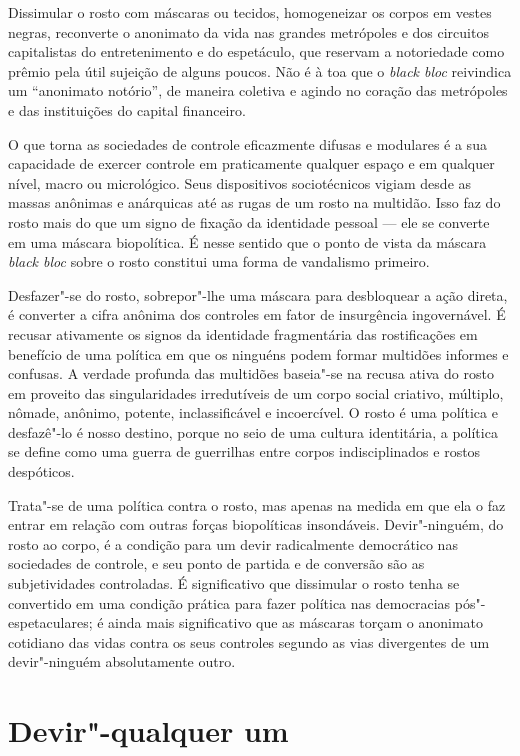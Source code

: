 Dissimular o rosto com máscaras ou tecidos, homogeneizar os corpos em
vestes negras, reconverte o anonimato da vida nas grandes metrópoles e
dos circuitos capitalistas do entretenimento e do espetáculo, que
reservam a notoriedade como prêmio pela útil sujeição de alguns poucos.
Não é à toa que o \emph{black bloc }reivindica um ``anonimato
notório'', de maneira coletiva e agindo no coração das metrópoles
e das instituições do capital financeiro.

O que torna as sociedades de controle eficazmente difusas e modulares é
a sua capacidade de exercer controle em praticamente qualquer espaço e
em qualquer nível, macro ou micrológico. Seus dispositivos sociotécnicos
vigiam desde as massas anônimas e anárquicas até as rugas de um rosto na
multidão. Isso faz do rosto mais do que um signo de fixação da
identidade pessoal --- ele se converte em uma máscara biopolítica. É
nesse sentido que o ponto de vista da máscara \emph{black bloc} sobre o
rosto constitui uma forma de vandalismo primeiro.

Desfazer"-se do rosto, sobrepor"-lhe uma máscara para desbloquear a ação
direta, é converter a cifra anônima dos controles em fator de
insurgência ingovernável. É recusar ativamente os signos da identidade
fragmentária das rostificações em benefício de uma política em que os
ninguéns podem formar multidões informes e confusas. A verdade profunda
das multidões baseia"-se na recusa ativa do rosto em proveito das
singularidades irredutíveis de um corpo social criativo, múltiplo,
nômade, anônimo, potente, inclassificável e incoercível. O rosto é uma
política e desfazê"-lo é nosso destino, porque no seio de uma cultura
identitária, a política se define como uma guerra de guerrilhas entre
corpos indisciplinados e rostos despóticos.

Trata"-se de uma política contra o rosto, mas apenas na medida em que ela
o faz entrar em relação com outras forças biopolíticas insondáveis.
Devir"-ninguém, do rosto ao corpo, é a condição para um devir
radicalmente democrático nas sociedades de controle, e seu ponto de
partida e de conversão são as subjetividades controladas. É
significativo que dissimular o rosto tenha se convertido em uma condição
prática para fazer política nas democracias pós"-espetaculares; é ainda
mais significativo que as máscaras torçam o anonimato cotidiano das
vidas contra os seus controles segundo as vias divergentes de um
devir"-ninguém absolutamente outro.

\section{Devir"-qualquer um}

